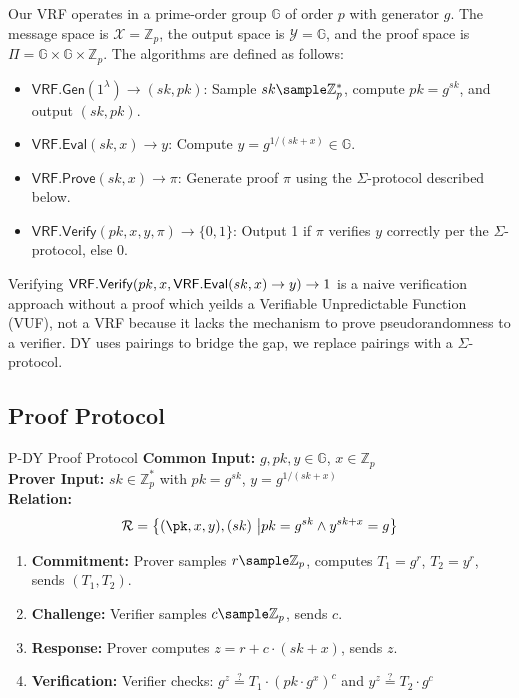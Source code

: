 Our VRF operates in a prime-order group $\mathbb{G}$ of order $p$ with generator $g$. The message space is $\mathcal{X} = \mathbb{Z}_p$, the output space is $\mathcal{Y} = \mathbb{G}$, and the proof space is $\Pi = \mathbb{G} \times \mathbb{G} \times \mathbb{Z}_p$. The algorithms are defined as follows:

\begin{itemize}
    \item $\mathsf{VRF.Gen}(1^\lambda) \to (sk, pk)$: Sample $sk \sample \mathbb{Z}_p^*$, compute $pk = g^{sk}$, and output $(sk, pk)$.
    \item $\mathsf{VRF.Eval}(sk, x) \to y$: Compute $y = g^{1/(sk + x)} \in \mathbb{G}$.
    \item $\mathsf{VRF.Prove}(sk, x) \to \pi$: Generate proof $\pi$ using the $\Sigma$-protocol described below.
    \item $\mathsf{VRF.Verify}(pk, x, y, \pi) \to \{0, 1\}$: Output 1 if $\pi$ verifies $y$ correctly per the $\Sigma$-protocol, else 0.
\end{itemize}

\begin{remark}
    Verifying $\mathsf{VRF.Verify}(pk, x, \mathsf{VRF.Eval}(sk, x) \to y) \to 1$ is a naive verification approach without a proof which yeilds a Verifiable Unpredictable Function (VUF), not a VRF because it lacks the mechanism to prove pseudorandomness to a verifier. DY uses pairings to bridge the gap, we replace pairings with a $\Sigma$-protocol. 
\end{remark}

\subsection{Proof Protocol}
\begin{protocol}{P-DY Proof Protocol}{}\label{protocol-pdy-protocol1}
\textbf{Common Input:} $g, pk, y \in \mathbb{G}$, $x \in \mathbb{Z}_p$ \\
\textbf{Prover Input:} $sk \in \mathbb{Z}_p^*$ with $pk = g^{sk}$, $y = g^{1/(sk + x)}$ \\
\textbf{Relation: }
\[
\mathcal{R} = \left\{ (\pk, x, y), (sk) \ \middle| pk = g^{sk} \land y^{sk + x} = g \right\}
\]
\begin{enumerate}
    \item \textbf{Commitment:} Prover samples $r \sample  \mathbb{Z}_p$, computes $T_1 = g^r$, $T_2 = y^r$, sends $(T_1, T_2)$.
    \item \textbf{Challenge:} Verifier samples $c \sample  \mathbb{Z}_p$, sends $c$.
    \item \textbf{Response:} Prover computes $z = r + c \cdot (sk + x)$, sends $z$.
    \item \textbf{Verification:} Verifier checks: $g^z \stackrel{?}{=} T_1 \cdot (pk \cdot g^x)^c$ and $y^z \stackrel{?}{=} T_2 \cdot g^c$
\end{enumerate}
\end{protocol}

